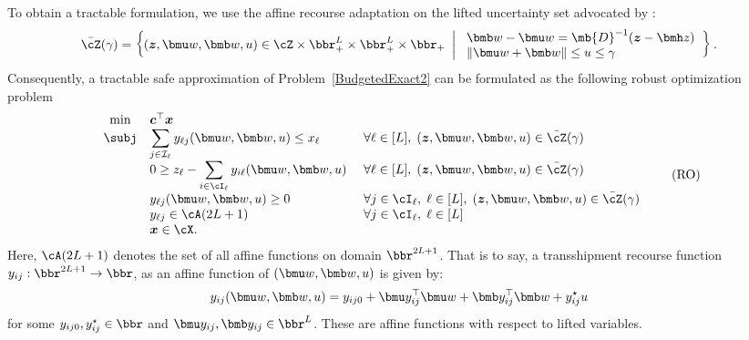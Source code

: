 \documentclass[mnsc, nonblindrev]{informswp}
\newcommand{\1}[1]{\mathds{1}{\left(#1\right)}}
\begin{document}
To obtain a tractable formulation, we use the affine recourse adaptation on the lifted uncertainty set advocated by \cite{chen2023occam}:
$$
\bar \cZ(\gamma) = \left\{({\bm z}, \bmu w, \bmb w, u) \in \cZ \times \bbr^L_+ \times \bbr^L_+ \times \bbr_+  ~\left|~ 
\begin{array}{l}
\bmb w - \bmu w = \mb{D}^{-1} (\bm z - \bmh  z) \\
\|\bmu w + \bmb w\|\leq u \leq \gamma 
\end{array}
\right.
\right\}.
$$
Consequently, a tractable safe approximation of Problem~\eqref{BudgetedExact2} can be formulated as the following robust optimization problem
\begin{equation} \label{prob:Budgeted_Allocation_Problem}
\begin{array}{cll}
\min &  \bm c^\top \bm x \\
     \subj 
     & \displaystyle \sum_{j \in \mathcal{I}_\ell} y_{\ell j}(\bmu w,\bmb w, u) \leq x_\ell &~ \forall \ell \in [L],\; (\bm z, \bmu w, \bmb w,u) \in \bar \cZ(\gamma)\\
     & \displaystyle 0\geq z_{\ell} - \sum_{i \in \cI_\ell} y_{i \ell}(\bmu w, \bmb w, u) &~ \forall \ell \in [L],\; (\bm z, \bmu w, \bmb w, u) \in \bar \cZ(\gamma) \\
     & \displaystyle y_{\ell j}(\bmu w, \bmb w, u) \geq 0 &~ \forall  j \in \cI_\ell,\; \ell \in [L],\; (\bm z, \bmu w, \bmb w, u) \in \bar \cZ(\gamma) \\
     & \displaystyle y_{\ell j}\in \cA(2L+1) &~ \forall  j \in \cI_\ell,\; \ell \in [L] \\
     &  {\bm x} \in \cX.
\end{array}
\tag{RO}
\end{equation}
Here, $\cA(2L+1)$ denotes the set of all affine functions on domain $\bbr^{2L+1}$. That is to say, a transshipment recourse function $y_{ij}:\bbr^{2L+1} \rightarrow \bbr$, as an affine function of $(\bmu w, \bmb w, u)$ is given by:
$$
y_{ij} (\bmu w, \bmb w, u) = y_{ij0}  + \bmu y_{ij}^\top \bmu w + \bmb y_{ij}^\top \bmb w + y_{ij}^\star u
$$
for some $y_{ij0}, y_{ij}^\star \in \bbr$ and $\bmu y_{ij}, \bmb y_{ij} \in \bbr^L$. 
These are affine functions with respect to lifted variables. 
\end{document}
